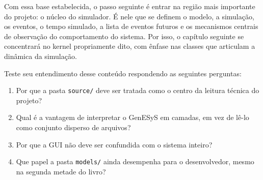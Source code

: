 Com essa base estabelecida, o passo seguinte é entrar na região mais importante do projeto: o núcleo do simulador. É nele que se definem o modelo, a simulação, os eventos, o tempo simulado, a lista de eventos futuros e os mecanismos centrais de observação do comportamento do sistema. Por isso, o capítulo seguinte se concentrará no kernel propriamente dito, com ênfase nas classes que articulam a dinâmica da simulação.

Teste seu entendimento desse conteúdo respondendo as seguintes perguntas:

\begin{enumerate}
    \item Por que a pasta \texttt{source/} deve ser tratada como o centro da leitura técnica do projeto?

    \item Qual é a vantagem de interpretar o GenESyS em camadas, em vez de lê-lo como conjunto disperso de arquivos?

    \item Por que a GUI não deve ser confundida com o sistema inteiro?

    \item Que papel a pasta \texttt{models/} ainda desempenha para o desenvolvedor, mesmo na segunda metade do livro?
\end{enumerate}